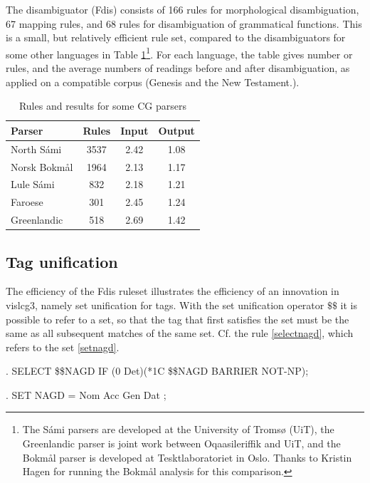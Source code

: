 \documentclass[11pt]{article}
\begin{document}
The disambiguator (Fdis) consists of 166 rules for morphological disambiguation,  67 mapping rules, and 68 rules for disambiguation of grammatical functions. This is a small, but relatively efficient rule set, compared to the disambiguators for some other languages in Table \ref{rulecount}\footnote{The Sámi parsers are developed at the University of Tromsø (UiT), the Greenlandic parser is joint work between Oqaasileriffik and UiT, and the Bokmål parser is developed at Tesktlaboratoriet in Oslo. Thanks to Kristin Hagen for running the Bokmål analysis for this comparison.}. For each language, the table gives number or rules, and the average numbers of readings before and after disambiguation, as applied on a compatible corpus (Genesis and the New Testament.).

\begin{table}[htdp]
\caption{Rules and results for some CG parsers}
\begin{center}
\begin{tabular}{|l|c|c|c|}
\hline
Parser & Rules & Input & Output \\
\hline
North Sámi	  & 3537 & 2.42 & 1.08 \\
Norsk Bokmål  & 1964 & 2.13 & 1.17 \\
Lule Sámi	  &  832 & 2.18 & 1.21 \\
Faroese		  &  301 & 2.45 & 1.24 \\
Greenlandic	  &  518 & 2.69 & 1.42 \\
\hline
\end{tabular}
\end{center}
\label{rulecount}
\end{table}%

\subsection{Tag unification}

The efficiency of the Fdis ruleset illustrates the efficiency of an innovation in vislcg3, namely set unification for tags. With the set unification operator $\$\$$ it is possible to refer to a set, so that the tag that first satisfies the set must be the same as all subsequent matches of the same set. Cf. the rule \ref{selectnagd}, which refers to the set \ref{setnagd}.

\begin{flushleft}
\ex.\label{selectnagd} \small{SELECT \$\$NAGD IF (0 Det)(*1C \$\$NAGD BARRIER NOT-NP);}

\ex.\label{setnagd} \small{SET NAGD = Nom Acc Gen Dat ;}
\end{flushleft}
\end{document}
